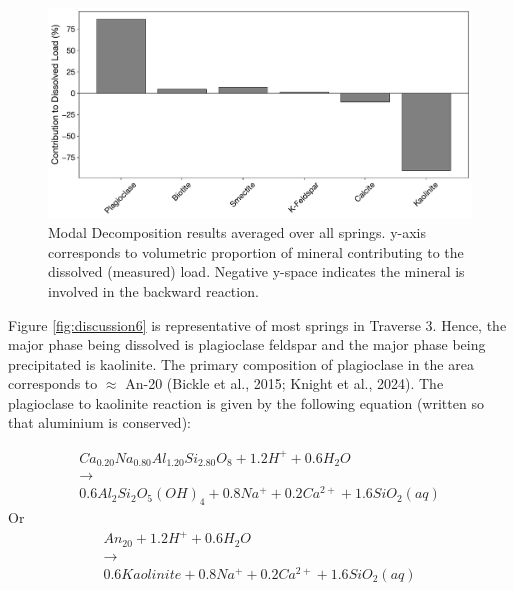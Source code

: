\begin{figure}[h]
    \centering
    \includegraphics[width=\textwidth]{Normalized_Average_Mineral_Volume_Changes.pdf}
    \caption{Modal Decomposition results averaged over all springs. y-axis corresponds to volumetric proportion of mineral contributing to the dissolved (measured) load. Negative y-space indicates the mineral is involved in the backward reaction.}
    \label{fig:modal}
\end{figure}

\FloatBarrier

Figure \ref{fig:discussion6} is representative of most springs in Traverse 3. Hence, the major phase being dissolved is plagioclase feldspar and the major phase being precipitated is kaolinite. The primary composition of plagioclase in the area corresponds to $\approx$ An-20 (Bickle et al., 2015; Knight et al., 2024).  The plagioclase to kaolinite reaction is given by the following equation (written so that aluminium is conserved):

\begin{equation}
    \begin{matrix}
Ca_{0.20}Na_{0.80}Al_{1.20}Si_{2.80}O_{8} + 1.2H^{+} + 0.6 H_{2}O \\ \rightarrow\\ 0.6 Al_{2}Si_{2}O_{5}(OH)_{4} + 0.8 Na^{+} + 0.2 Ca^{2+} + 1.6 SiO_{2}(aq)
    \end{matrix}
\end{equation}
\quad Or
\begin{equation}
    \begin{matrix}
An_{20} + 1.2 H^{+} + 0.6 H_{2}O\\ \rightarrow\\ 0.6 Kaolinite + 0.8 Na^{+} + 0.2 Ca^{2+} + 1.6 SiO_{2}(aq)
\end{matrix}
\label{eq:10}
\end{equation}\\

